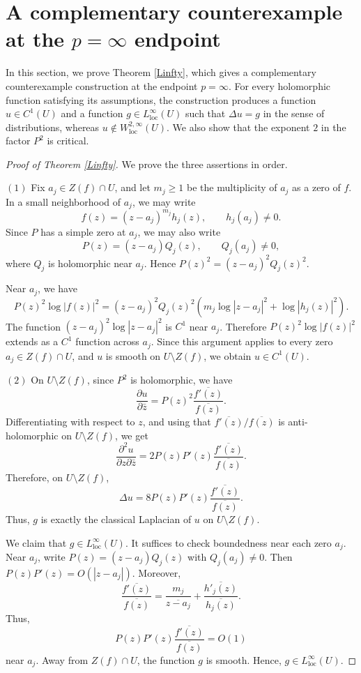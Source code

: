 \documentclass[12pt,twoside]{amsart}
\numberwithin{equation}{section}
\numberwithin{definition}{section} %
\begin{document}
\section{A complementary counterexample at the $p=\infty$ endpoint}\label{sec4}

In this section, we prove Theorem \ref{Linfty}, which gives a complementary counterexample construction at the endpoint $p = \infty$. For every holomorphic function satisfying its assumptions, the construction produces a function $u \in C^1(U)$ and a function $g \in L^\infty_{\mathrm{loc}}(U)$ such that
$
\Delta u = g
$
in the sense of distributions, whereas
$
u \notin W^{2,\infty}_{\mathrm{loc}}(U).
$
We also show that the exponent $2$ in the factor $P^2$ is critical.


\begin{proof}[Proof of Theorem \ref{Linfty}]

We prove the three assertions in order.

$(1)$ Fix $a_j\in Z(f)\cap U$, and let $m_j\ge1$ be the multiplicity of $a_j$ as a zero of $f$.
In a small neighborhood of $a_j$, we may write
$$
f(z)=(z-a_j)^{m_j}h_j(z),
\qquad h_j(a_j)\neq0.
$$
Since $P$ has a simple zero at $a_j$, we may also write
$$
P(z)=(z-a_j)Q_j(z),
\qquad Q_j(a_j)\neq0,
$$
where $Q_j$ is holomorphic near $a_j$. Hence $P(z)^2=(z-a_j)^2Q_j(z)^2$.

Near $a_j$, we have
$$
P(z)^2\log|f(z)|^2
=
(z-a_j)^2Q_j(z)^2
\left(
m_j\log|z-a_j|^2+\log|h_j(z)|^2
\right).
$$
The function $(z-a_j)^2\log|z-a_j|^2$ is $C^1$ near $a_j$. Therefore
$P(z)^2\log|f(z)|^2$ extends as a $C^1$ function across $a_j$.
Since this argument applies to every zero $a_j\in Z(f)\cap U$, and $u$ is smooth on
$U\setminus Z(f)$, we obtain $u\in C^1(U)$.

$(2)$ On $U\setminus Z(f)$, since $P^2$ is holomorphic, we have
$$
\frac{\partial u}{\partial\bar z}
=
P(z)^2\frac{\overline{f'(z)}}{\overline{f(z)}}.
$$
Differentiating with respect to $z$, and using that
$\overline{f'(z)}/\overline{f(z)}$ is anti-holomorphic on $U\setminus Z(f)$, we get
$$
\frac{\partial^2 u}{\partial z\partial\bar z}
=
2P(z)P'(z)\frac{\overline{f'(z)}}{\overline{f(z)}}.
$$
Therefore, on $U\setminus Z(f)$,
$$
\Delta u
=
8P(z)P'(z)\frac{\overline{f'(z)}}{\overline{f(z)}}.
$$
Thus, $g$ is exactly the classical Laplacian of $u$ on $U\setminus Z(f)$.

We claim that $g\in L^\infty_{\mathrm{loc}}(U)$. It suffices to check boundedness near each zero
$a_j$. Near $a_j$, write $P(z)=(z-a_j)Q_j(z)$ with $Q_j(a_j)\neq0$. Then
$P(z)P'(z)=O(|z-a_j|)$. Moreover,
$$
\frac{\overline{f'(z)}}{\overline{f(z)}}
= \frac{m_j}{\overline{z - a_j}} + \frac{\overline{h'_j(z)}}{\overline{h_j(z)}}.
$$
Thus,
$$
P(z)P'(z)\frac{\overline{f'(z)}}{\overline{f(z)}}=O(1)
$$
near $a_j$. Away from $Z(f)\cap U$, the function $g$ is smooth. Hence,
$g\in L^\infty_{\mathrm{loc}}(U)$.


\end{proof}
\end{document}

